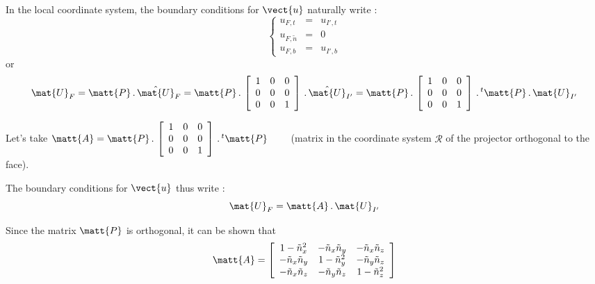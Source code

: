 In the local coordinate system, the boundary conditions for $\vect{u}$
naturally write :\\
\begin{equation}
\left\{\begin{array}{lcl}
u_{F,t} & = & u_{I',t}\\
u_{F,\tilde{n}} & = & 0\\
u_{F,b} & = & u_{I',b}
\end{array}\right.
\end{equation}
or
\begin{equation}
\mat{U}_F = \matt{P}\,.\,\hat{\mat{U}}_F
= \matt{P}\,.\,\left[
\begin{array}{ccc}
1 & 0 & 0\\
0 & 0 & 0\\
0 & 0 & 1
\end{array}
\right]\,.\,\hat{\mat{U}}_{I'}
=\matt{P}\,.\,\left[
\begin{array}{ccc}
1 & 0 & 0\\
0 & 0 & 0\\
0 & 0 & 1
\end{array}
\right]\,.\,^t\matt{P}\,.\,\mat{U}_{I'}
\end{equation}


Let's take
$\matt{A}=\matt{P}\,.\,\left[
\begin{array}{ccc}
1 & 0 & 0\\
0 & 0 & 0\\
0 & 0 & 1
\end{array}
\right]\,.\,^t\matt{P}\qquad$ (matrix in the coordinate system $\mathcal{R}$
of the projector orthogonal to the face).

The boundary conditions for  $\vect{u}$ thus write :
\begin{equation}
\mat{U}_F = \matt{A}\,.\,\mat{U}_{I'}
\end{equation}

Since the matrix $\matt{P}$ is orthogonal, it can be shown that
\begin{equation}
\matt{A}=\left[
\begin{array}{ccc}
1-\tilde{n}_x^2 & -\tilde{n}_x\tilde{n}_y & -\tilde{n}_x\tilde{n}_z\\
-\tilde{n}_x\tilde{n}_y & 1-\tilde{n}_y^2 & -\tilde{n}_y\tilde{n}_z\\
-\tilde{n}_x\tilde{n}_z & -\tilde{n}_y\tilde{n}_z & 1-\tilde{n}_z^2
\end{array}\right]
\end{equation}

